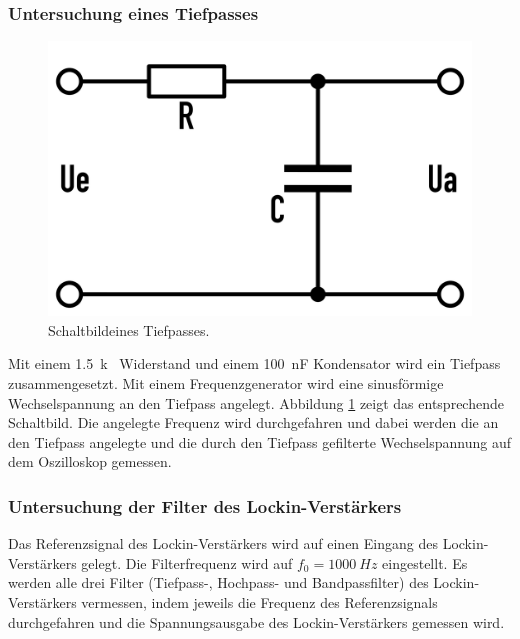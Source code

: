 \documentclass[12pt,a4paper]{article}
\begin{document}
\subsubsection{Untersuchung eines Tiefpasses}

\begin{figure}
\centering
\includegraphics[scale=0.1]{Bilder/Vorversuch1/Tiefpass_Schaltbild.png}
\caption[test]{Schaltbild\footnotemark eines Tiefpasses.}
\label{fig:Tiefpass_Schaltbild}
\end{figure}

Mit einem \SI{1,5}{k \Omega} Widerstand und einem \SI{100}{nF} Kondensator wird ein Tiefpass zusammengesetzt. Mit einem Frequenzgenerator wird eine sinusförmige Wechselspannung an den Tiefpass angelegt. Abbildung \ref{fig:Tiefpass_Schaltbild} zeigt das entsprechende Schaltbild. Die angelegte Frequenz wird durchgefahren und dabei werden die an den Tiefpass angelegte und die durch den Tiefpass gefilterte Wechselspannung auf dem Oszilloskop gemessen.

\subsubsection{Untersuchung der Filter des Lockin-Verstärkers}
Das Referenzsignal des Lockin-Verstärkers wird auf einen Eingang des Lockin-Verstärkers gelegt. Die Filterfrequenz wird auf $f_0 = \SI{1000}{Hz}$ eingestellt. Es werden alle drei Filter (Tiefpass-, Hochpass- und Bandpassfilter) des Lockin-Verstärkers vermessen, indem jeweils die Frequenz des Referenzsignals durchgefahren und die Spannungsausgabe des Lockin-Verstärkers gemessen wird.
\end{document}
